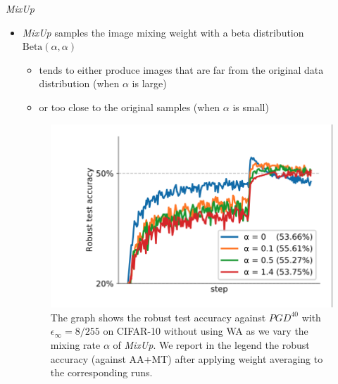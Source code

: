 \begin{frame}{\textit{MixUp}}
    \begin{itemize}
        \item \textit{MixUp} samples the image mixing weight with a beta distribution $\text{Beta}(\alpha, \alpha)$
        \begin{itemize}
            \item tends to either produce images that are far from the original data distribution (when $\alpha$ is large)
            \item or too close to the original samples (when $\alpha$ is small)
        \end{itemize}
        \begin{figure}
            \centering
            \includegraphics[height=0.4\textheight]{pic/fig 5.png}
            \caption{The graph shows the robust test accuracy against $PGD^{40}$ with $\epsilon_\infty = 8/255$ on CIFAR-10 without using WA as we vary the mixing rate $\alpha$ of \textit{MixUp}. We report in the legend the robust accuracy (against AA+MT) after applying weight averaging to the corresponding runs.}
            \label{fig:fig5}
        \end{figure}
    \end{itemize}
\end{frame}

